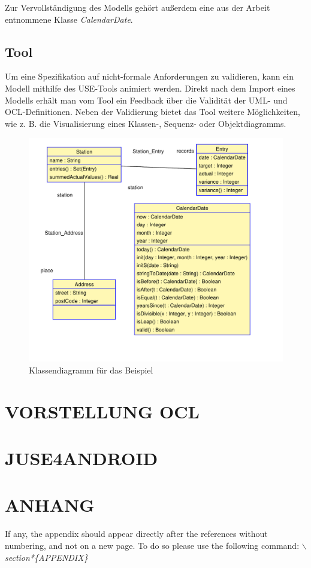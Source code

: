 \documentclass[a4paper,twoside]{article}
\begin{document}
Zur Vervollständigung des Modells gehört außerdem eine aus der Arbeit \cite{SilvaMasterThesis} entnommene Klasse \textit{CalendarDate}.

\subsection{Tool}

Um eine Spezifikation auf nicht-formale Anforderungen zu validieren, kann ein Modell mithilfe des USE-Tools animiert werden. Direkt nach dem Import eines Modells erhält man vom Tool ein Feedback über die Validität der UML- und OCL-Definitionen. Neben der Validierung bietet das Tool weitere Möglichkeiten, wie z. B. die Visualisierung eines Klassen-, Sequenz- oder Objektdiagramms.

\begin{figure}[!h]
	\includegraphics[scale=.45]{pics/USE_class_diagramm.pdf}
	\captionsetup{labelformat=empty}
	\caption{Klassendiagramm für das Beispiel}
\end{figure}

\section{\uppercase{Vorstellung OCL}}

\section{\uppercase{JUSE4Android}}

\vfill

{\small
}

\section*{\uppercase{Anhang}}

\noindent If any, the appendix should appear directly after the
references without numbering, and not on a new page. To do so please use the following command:
\textit{$\backslash$section*\{APPENDIX\}}


\vfill
\end{document}

